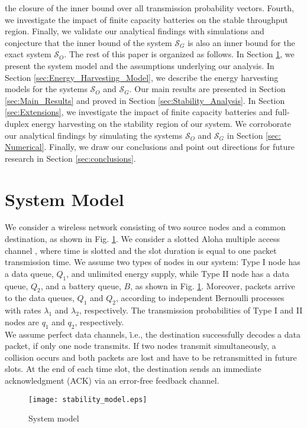 \documentclass[draftcls,12pt,onecolumn]{IEEEtran}
\begin{document}
the closure of the inner bound over all transmission probability vectors. Fourth, we investigate the impact of finite capacity batteries on the stable throughput region. Finally, we validate our analytical findings with simulations and conjecture that the inner bound of the system $\mathcal{S}_G$ is also an inner bound for the exact system $ \mathcal{S}_O$.
\newline \indent The rest of this paper is organized as follows. In Section \ref{sec:System_Model}, we present the system model and the assumptions underlying our analysis. In Section \ref{sec:Energy_Harvesting_Model}, we describe the energy harvesting models for the systems $\mathcal{S}_O $ and $\mathcal{S}_G$. Our main results are presented in Section \ref{sec:Main_Results} and proved in Section \ref{sec:Stability_Analysis}. In Section \ref{sec:Extensions}, we investigate the impact of finite capacity batteries and full-duplex energy harvesting on the stability region of our system. We corroborate our analytical findings by simulating the systems $\mathcal{S}_O $ and $\mathcal{S}_G$ in Section \ref{sec: Numerical}. Finally, we draw our conclusions and point out directions for future research in Section \ref{sec:conclusions}.
\section{System Model} \label{sec:System_Model}
We consider a wireless network consisting of two source nodes and a common destination, as shown in Fig. \ref{fig:EH_model}. We consider a slotted Aloha multiple access channel \cite{abramson1970aloha}, where time is slotted and the slot duration is equal to one packet transmission time. We assume two types of nodes in our system: Type I node has a data queue, $Q_1$, and unlimited energy supply, while Type II node has a data queue, $Q_2$, and a battery queue, $B$, as shown in Fig. \ref{fig:EH_model}. Moreover, packets arrive to the data queues, $ Q_1$ and $Q_2$, according to independent Bernoulli processes with rates $\lambda_1$ and $\lambda_2$, respectively. The transmission probabilities of Type I and II nodes are $q_1$ and $q_2$, respectively.\\
\indent We assume perfect data channels, \.i.e., the destination successfully decodes a data packet, if only one node transmits. If two nodes transmit simultaneously, a collision occurs and both packets are lost and have to be retransmitted in future slots. At the end of each time slot, the destination sends an immediate acknowledgment (ACK) via an error-free feedback channel.
\begin{figure}[t]
\texttt{[image: stability\_model.eps]}
\centering
\caption{System model}\label{fig:EH_model}
\end{figure}
\end{document}

